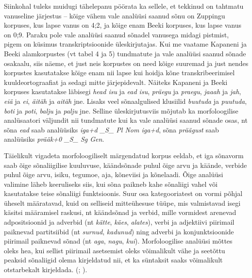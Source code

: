 \documentclass[12pt]{article}
\begin{document}
Siinkohal tuleks muidugi tähelepanu pöörata ka sellele, et tekkinud on tahtmatu vanuseline järjestus -- kõige vähem vale analüüsi saanud sõnu on Zuppingu korpuses, kus lapse vanus on 4;2, ja kõige enam Beeki korpuses, kus lapse vanus on 0;9. Paraku pole vale analüüsi saanud sõnadel vanusega midagi pistmist, pigem on küsimus transkriptsioonide üleskirjutajas. Kui me vaatame Kapaneni ja Beeki alamkorpustes (vt tabel 4 ja 5) tundmatute ja vale analüüsi saanud sõnade osakaalu, siis näeme, et just neis korpustes on need kõige suuremad ja just nendes korpustes kasutatakse kõige enam nii lapse kui hoidja kõne transkribeerimisel kuuldeortograafiat ja sedagi mitte järjepidevalt. Näiteks Kapaneni ja Beeki korpuses kasutatakse läbisegi \emph{head isu} ja \emph{ead isu}, \emph{präegu} ja \emph{praegu}, \emph{jaaah} ja \emph{jah}, \emph{eiä} ja \emph{ei}, \emph{äitäh} ja \emph{aitäh} jne. Lisaks veel sõnaalgulised klusiilid \emph{buutuda} ja \emph{puutuda}, \emph{boti} ja \emph{poti}, \emph{balju} ja \emph{palju} jne. Selline üleskirjutusviis mõjutab ka morfoloogilise analüsaatori väljundit nii tundmatute kui ka vale analüüsi saanud sõnade osas, nt sõna \emph{ead} saab analüüsiks \emph{iga+d \_S\_ Pl Nom iga+d}, sõna \emph{präägust} saab analüüsiks \emph{prääk+0 \_S\_ Sg Gen}.


Täielikult vigadeta morfoloogiliselt märgendatud korpus eeldab, et iga sõnavorm saab õige sõnaliigilise kuuluvuse, käändsõnade puhul õige arvu ja käände, verbide puhul õige arvu, isiku, tegumoe, aja, kõneviisi ja kõnelaadi. Õige analüüsi valimine läheb keeruliseks siis, kui sõna paikneb kahe sõnaliigi vahel või kasutatakse teise sõnaliigi funktsioonis. Suur osa kategooriatest on vormi põhjal üheselt määratavad, kuid on selliseid mitteühesuse tüüpe, mis valmistavad isegi käsitsi määramisel raskusi, nt käändsõnad ja verbid, mille vormidest arenevad adpositsioonid ja adverbid (nt \emph{kätte}, \emph{käes}, \emph{alates}), verbi ja adjektiivi piirimail paiknevad partitsiibid (nt \emph{surnud}, \emph{kadunud}) ning adverbi ja konjunktsioonide piirimail paiknevad sõnad (nt \emph{aga}, \emph{nagu}, \emph{kui}). Morfoloogilise analüüsi mõttes oleks hea, kui sellist piirimail asetsemist oleks võimalikult vähe ja seetõttu peaksid sõnaliigid olema kirjeldatud nii, et ka süntaksit saaks võimalikult otstarbekalt kirjeldada. (\citealp[102--104]{Sonaliik}; \citealp[627--631]{Sonaliik2}).
\end{document}
